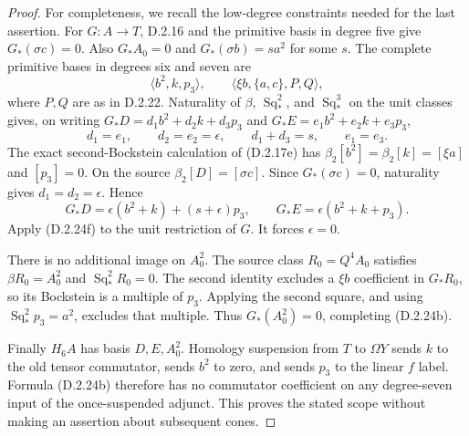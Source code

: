 \begin{proof}
For completeness, we recall the low-degree constraints needed
for the last assertion. For $G:A\to T$, \textup{D.2.16}
and the primitive basis in degree five give $G_*(\sigma c)=0$.
Also $G_*A_0=0$ and $G_*(\sigma b)=s a^2$ for some $s$.
The complete primitive bases in degrees six and seven are
\[
 \langle b^2,k,p_3\rangle,
 \qquad
 \langle\xi b,\{a,c\},P,Q\rangle,
 \tag{D.2.24g}
\]
where $P,Q$ are as in \textup{D.2.22}. Naturality of
$\beta$, $\operatorname{Sq}_*^2$, and
$\operatorname{Sq}_*^3$ on the unit classes gives,
on writing $G_*D=d_1b^2+d_2k+d_3p_3$ and
$G_*E=e_1b^2+e_2k+e_3p_3$,
\[
 d_1=e_1,\qquad d_2=e_2=\epsilon,\qquad
 d_1+d_3=s,\qquad e_1=e_3.
 \tag{D.2.24h}
\]
The exact second-Bockstein calculation of
\textup{(D.2.17e)} has
$\beta_2[b^2]=\beta_2[k]=[\xi a]$ and $[p_3]=0$.
On the source $\beta_2[D]=[\sigma c]$.
Since $G_*(\sigma c)=0$, naturality gives
$d_1=d_2=\epsilon$. Hence
\[
 G_*D=\epsilon(b^2+k)+(s+\epsilon)p_3,
 \qquad
 G_*E=\epsilon(b^2+k+p_3).
 \tag{D.2.24i}
\]
Apply \textup{(D.2.24f)} to the unit restriction of $G$.
It forces $\epsilon=0$.

There is no additional image on $A_0^2$. The source class
$R_0=Q^4A_0$ satisfies $\beta R_0=A_0^2$ and
$\operatorname{Sq}_*^2R_0=0$. The second identity excludes
a $\xi b$ coefficient in $G_*R_0$, so its Bockstein is
a multiple of $p_3$. Applying the second square, and using
$\operatorname{Sq}_*^2p_3=a^2$, excludes that multiple.
Thus $G_*(A_0^2)=0$, completing \textup{(D.2.24b)}.

Finally $H_6A$ has basis $D,E,A_0^2$. Homology suspension
from $T$ to $\Omega Y$ sends $k$ to the old tensor
commutator, sends $b^2$ to zero, and sends $p_3$ to
the linear $f$ label. Formula \textup{(D.2.24b)} therefore
has no commutator coefficient on any degree-seven input
of the once-suspended adjunct. This proves the stated
scope without making an assertion about subsequent cones.
\end{proof}
